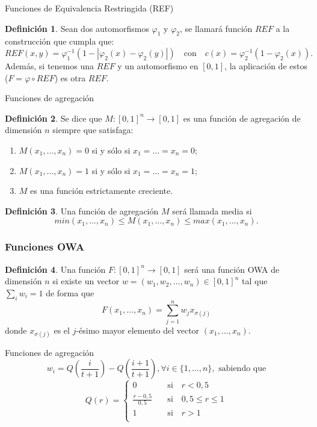 \documentclass{beamer}
\theoremstyle{plain} %
\theoremstyle{definition}
\newtheorem{defn}{Definición}
\def\unitinterval{[0,1]}
\begin{document}
\begin{frame}{Funciones de Equivalencia Restringida (REF)}
  \begin{defn}\label{prop:contruccionref}
  Sean dos automorfismos $\varphi_{1}$ y $\varphi_{2}$, se llamará función $REF$ a la construcción que cumpla que:
  $$REF(x,y) = \varphi_1^{-1}(1-|\varphi_2(x)-\varphi_2(y)|) \quad\text{con}\quad c(x) = \varphi_2^{-1}(1-\varphi_2(x)).$$
  Además, si tenemos una $REF$ y un automorfismo en $\unitinterval$, la aplicación de estos ($F=\varphi \circ REF$) es otra $REF$.
  \end{defn}
\end{frame}

\begin{frame}{Funciones de agregación}
  \begin{defn}\label{def:agregacion}
  Se dice que $M : \unitinterval^n \rightarrow \unitinterval$ es una función de agregación de dimensión $n$ siempre que satisfaga:
    \begin{enumerate}
    \item $M(x_1, \dots, x_n) = 0$ si y sólo si $x_1=\dots=x_n=0$;
    \item $M(x_1, \dots, x_n) = 1$ si y sólo si $x_1=\dots=x_n=1$;
    \item $M$ es una función estrictamente creciente.
    \end{enumerate}
  \end{defn}
  \begin{defn}
  Una función de agregación $M$ será llamada media si
  $$ min(x_{1}, \dots, x_{n})  \leq M(x_{1}, \dots, x_{n}) \leq max(x_{1}, \dots, x_{n}).$$
  \end{defn}
\end{frame}

\begin{frame}
  \frametitle{Funciones OWA}
  \begin{defn}\label{def:owa}
  Una  función $F:\unitinterval^n\rightarrow\unitinterval$ será una función OWA de dimensión $n$ si existe un vector $w=(w_{1},w_{2},\dots,w_{n})\in \unitinterval^{n}$ tal que $\sum_{i}w_{i}=1$ de forma que
  $$F(x_{1},\dots,x_{n})=\sum^{n}_{j=1}w_{j}x_{\sigma(j)}$$
  donde $x_{\sigma(j)}$ es el $j$-ésimo mayor elemento del vector $(x_{1},\dots,x_{n})$.
  \end{defn}
\end{frame}
\begin{frame}{Funciones de agregación}
  \begin{equation*}\label{eq:pesosowamayoria}
   w_i = Q\left(\frac{i}{t+1}\right) - Q\left(\frac{i+1}{t+1}\right), \forall i\in \{1, \dots, n\}, \text{   sabiendo que}
  \end{equation*}
   $$Q(r) = \left\{\begin{aligned}
    0           &\quad \text{si}\quad r<0,5\\
    \frac{r-0,5}{0,5} &\quad \text{si}\quad 0,5\leq r\leq 1\\
    1           &\quad \text{si}\quad r>1\\
  \end{aligned}\right.$$
\end{frame}
\end{document}
